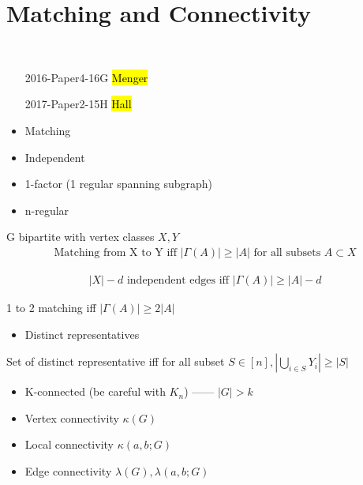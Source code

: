 \section{Matching and Connectivity}\label{sec:matching-and-connectivity}

\begin{exam}
    \,
    \begin{enumerate}
        \item[2016-Paper4-16G] \hl{Menger}
        \item[2017-Paper2-15H] \hl{Hall}
    \end{enumerate}
\end{exam}

\begin{itemize}
    \item Matching
    \item Independent
    \item 1-factor (1 regular spanning subgraph)
    \item n-regular
\end{itemize}

\begin{thm}[Hall]
    G bipartite with vertex classes $X, Y$
    \begin{align*}
        \text{Matching from X to Y iff $|\Gamma(A)| \geq |A|$ for all subsets $A \subset X$}
    \end{align*}
\end{thm}

\begin{thm}
    \begin{align*}
        |X| - d \text{ independent edges iff } |\Gamma(A)| \geq |A| - d
    \end{align*}
\end{thm}

\begin{thm}
    1 to 2 matching iff $|\Gamma(A)| \geq 2|A|$
\end{thm}

\begin{itemize}
    \item Distinct representatives
\end{itemize}

\begin{cor}
    Set of distinct representative iff for all subset $S \in [n], |\bigcup_{i \in S}{Y_i}| \geq |S|$
\end{cor}

\begin{itemize}
    \item K-connected (be careful with $K_n$) ------ $|G| > k$
    \item Vertex connectivity $\kappa (G)$
    \item Local connectivity $\kappa(a, b; G)$
    \item Edge connectivity $\lambda(G), \lambda(a, b; G)$
\end{itemize}

